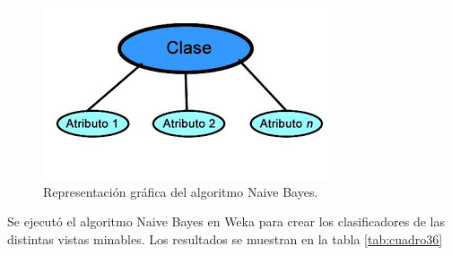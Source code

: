 \begin{figure}[H]
\begin{centering}
\includegraphics[scale=0.6]{nive}
\par\end{centering}
\caption{Representación gráfica del algoritmo Naive Bayes.}
\end{figure}
Se ejecutó el algoritmo Naive Bayes en Weka para crear los clasificadores de las distintas vistas minables. Los resultados se muestran en la tabla \ref{tab:cuadro36}

